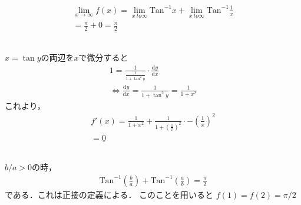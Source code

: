 \documentclass[dvipdfmx]{article}
\begin{document}
  \section{}
    \subsection{}
      \begin{align*}
        \lim_{x \to \infty} f(x) = \lim_{x \ to \infty} \mathrm{Tan}^{-1} x + \lim_{x \ to \infty} \mathrm{Tan}^{-1} \frac{1}{x}\\
        = \frac{\pi}{2} + 0 = \underline{\frac{\pi}{2}}
      \end{align*}
    \subsection{}
      $x = \tan y$の両辺を$x$で微分すると
      \begin{align*}
        1 = \frac{1}{\frac{1}{1 + \tan^2 y}} \cdot \frac{\mathrm{d}y}{\mathrm{d}x}\\
        \Leftrightarrow \frac{\mathrm{d}y}{\mathrm{d}x} = \frac{1}{1 +\tan^2 y} = \frac{1}{1 + x^2}
      \end{align*}
      これより，
      \begin{align*}
        f'(x) = \frac{1}{1 + x^2} + \frac{1}{1+\left(\frac{1}{x}\right)^2}\cdot -\left(\frac{1}{x}\right)^2\\
        = \underline{0}
      \end{align*}
    \subsection{}
      $b/a > 0$の時，
      \begin{align*}
        \mathrm{Tan}^{-1} \left(\frac{b}{a}\right) + \mathrm{Tan}^{-1} \left(\frac{a}{b}\right) = \frac{\pi}{2}
      \end{align*}
      である．これは正接の定義による．
      このことを用いると
      $f(1) = f(2) = \pi / 2$
  \section{}
    
\end{document}
